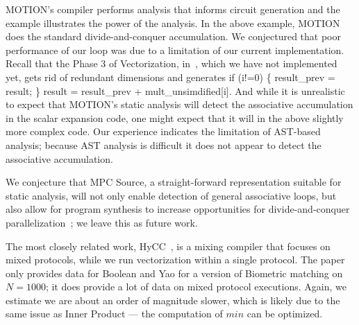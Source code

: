 MOTION's compiler performs analysis that informs circuit generation and the example illustrates the power of the analysis. In the above example, 
MOTION does the standard divide-and-conquer accumulation. We conjectured that poor performance of our loop was due to a
limitation of our current implementation. Recall that the Phase 3 of Vectorization, in~, which we have not implemented yet, gets rid of redundant 
dimensions and generates {\sf if (i!=0) \{ result\_prev = result; \} result = result\_prev + mult\_unsimdified[i]}. And while it is unrealistic to expect that MOTION's static analysis 
will detect the associative accumulation in the scalar expansion code, one might expect that it will in the above slightly more complex code. 
Our experience indicates the limitation of AST-based analysis; because AST analysis is difficult it does not appear to detect the associative accumulation.

We conjecture that MPC Source, a straight-forward representation suitable for static analysis, will not only enable detection of general associative loops, but also allow 
for program synthesis to increase opportunities for divide-and-conquer parallelization~\cite{Farzan:2021}; we leave this as future work. 

The most closely related work, HyCC~\cite{CCS:BDKKS18}, is a mixing compiler that focuses on mixed protocols, while we run vectorization within a single protocol. 
The paper only provides data for Boolean and Yao for a version of Biometric matching on $N=1000$; it does provide a lot of data on mixed protocol executions.
Again, we estimate we are about an order of magnitude slower, which is likely due to the same issue as Inner Product --- the computation of $\mathit{min}$ can be optimized. 




